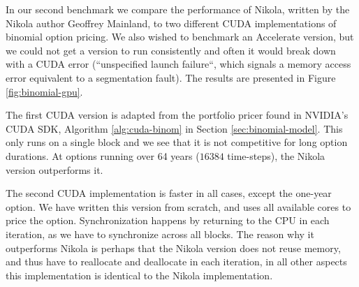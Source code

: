 In our second benchmark we compare the performance of Nikola, written
by the Nikola author Geoffrey Mainland, to two different CUDA
implementations of binomial option pricing. We also wished to
benchmark an Accelerate version, but we could not get a version to run
consistently and often it would break down with a CUDA error
(``unspecified launch failure``, which signals a memory access error
equivalent to a segmentation fault). The results are presented in
Figure \ref{fig:binomial-gpu}.

The first CUDA version is adapted from the portfolio pricer found in
NVIDIA's CUDA SDK, Algorithm \ref{alg:cuda-binom} in Section
\ref{sec:binomial-model}. This only runs on a single block and we see
that it is not competitive for long option durations. At options
running over 64 years ($16384$ time-steps), the Nikola
version outperforms it.

The second CUDA implementation is faster in all cases, except the
one-year option. We have written this version from scratch, and uses
all available cores to price the option. Synchronization happens by
returning to the CPU in each iteration, as we have to synchronize
across all blocks. The reason why it outperforms Nikola is perhaps
that the Nikola version does not reuse memory, and thus have to
reallocate and deallocate in each iteration, in all other aspects this
implementation is identical to the Nikola implementation.

